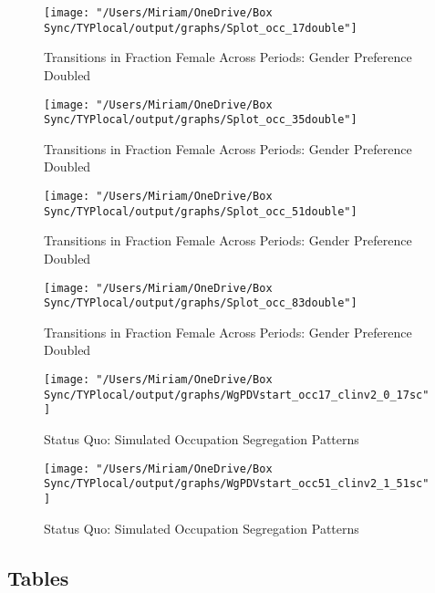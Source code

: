 \documentclass[12pt]{article}
\begin{document}
\begin{figure}[H]
\centering
\caption{Transitions in Fraction Female Across Periods: Gender Preference Doubled}
\label{ftransitions17}
\texttt{[image: "/Users/Miriam/OneDrive/Box Sync/TYPlocal/output/graphs/Splot\_occ\_17double"]}
\end{figure}

\begin{figure}[H]
\centering
\caption{Transitions in Fraction Female Across Periods: Gender Preference Doubled}
\label{ftransitions35}
\texttt{[image: "/Users/Miriam/OneDrive/Box Sync/TYPlocal/output/graphs/Splot\_occ\_35double"]}
\end{figure}

\begin{figure}[H]
\centering
\caption{Transitions in Fraction Female Across Periods: Gender Preference Doubled}
\label{ftransitions51}
\texttt{[image: "/Users/Miriam/OneDrive/Box Sync/TYPlocal/output/graphs/Splot\_occ\_51double"]}
\end{figure}

\begin{figure}[H]
\centering
\caption{Transitions in Fraction Female Across Periods: Gender Preference Doubled}
\label{ftransitions83}
\texttt{[image: "/Users/Miriam/OneDrive/Box Sync/TYPlocal/output/graphs/Splot\_occ\_83double"]}
\end{figure}

% 

\begin{figure}[H]
\centering
\caption{Status Quo: Simulated Occupation Segregation Patterns}
\label{nurses}
\texttt{[image: "/Users/Miriam/OneDrive/Box Sync/TYPlocal/output/graphs/WgPDVstart\_occ17\_clinv2\_0\_17sc"]}
\end{figure}
\begin{figure}[H]
\centering
\caption{Status Quo: Simulated Occupation Segregation Patterns}
\label{mechanics}
\texttt{[image: "/Users/Miriam/OneDrive/Box Sync/TYPlocal/output/graphs/WgPDVstart\_occ51\_clinv2\_1\_51sc"]}
\end{figure}


\newpage
\subsection{Tables}



%
%
\end{document}
